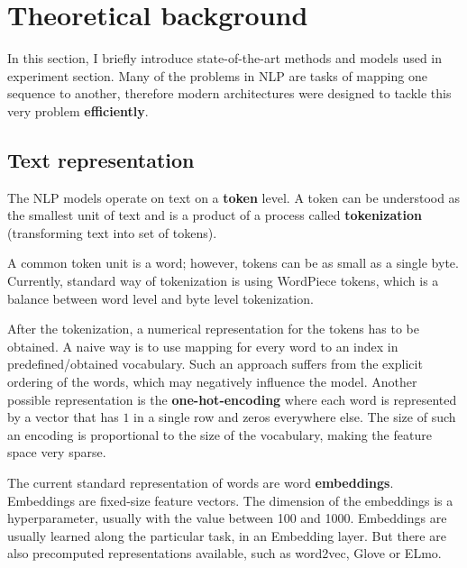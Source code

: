 \chapter{Theoretical background}
In this section, I briefly introduce state-of-the-art methods and models used in experiment section. Many of the problems in NLP are tasks of mapping one sequence to another, therefore modern architectures were designed to tackle this very problem \textbf{efficiently}.





\section{Text representation}
The NLP models operate on text on a \textbf{token} level. A token can be understood as the smallest unit of text and is a product of a process called \textbf{tokenization} (transforming text into set of tokens).

A common token unit is a word; however, tokens can be as small as a single byte. Currently, standard way of tokenization is using WordPiece tokens, which is a balance between word level and byte level tokenization.

After the tokenization, a numerical representation for the tokens has to be obtained. A naive way is to use mapping for every word to an index in predefined/obtained vocabulary. Such an approach suffers from the explicit ordering of the words, which may negatively influence the model. Another possible representation is the \textbf{one-hot-encoding} where each word is represented by a vector that has $1$ in a single row and zeros everywhere else. The size of such an encoding is proportional to the size of the vocabulary, making the feature space very sparse. 

The current standard representation of words are word \textbf{embeddings}. Embeddings are fixed-size feature vectors. The dimension of the embeddings is a hyperparameter, usually with the value between 100 and 1000. Embeddings are usually learned along the particular task, in an Embedding layer. But there are also precomputed representations available, such as word2vec, Glove or ELmo.
\newpage






